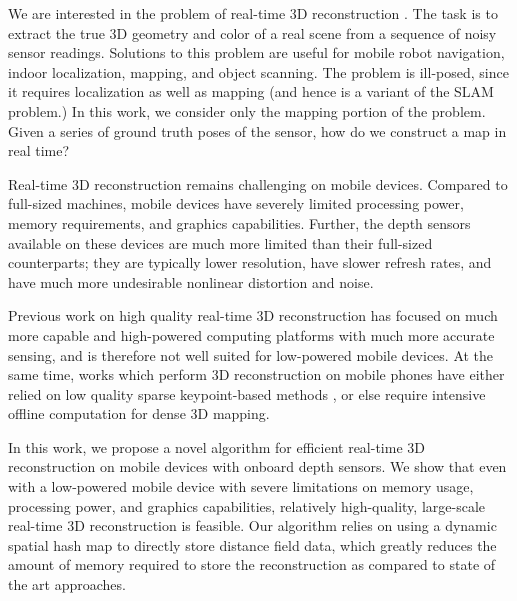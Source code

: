 \documentclass[10pt,twocolumn,letterpaper]{article}
\newcommand{\ssnote}[1]{{\xxnote{SS}{red}{#1}}}
\newcommand{\xxnote}[3]{}
\renewcommand{\xxnote}[3]{\color{#2}{#1: #3}}
\begin{document}
We are interested in the problem of real-time 3D reconstruction \ssnote{add generic cite}. The task is to
extract the true 3D geometry and color of a real scene from a sequence of noisy
sensor readings. Solutions to this problem are useful for mobile robot navigation,
indoor localization, mapping, and object scanning. The problem is ill-posed,
since it requires localization as well as mapping (and hence is a variant of
the SLAM problem.) 
\ssnote{You want to set this up by saying something like 'However, pose information is often available in hardware on 
several mobile devices'}
In this work, we consider only the mapping portion of the
problem. Given a series of ground truth poses of the sensor, how do we construct
a map in real time?

Real-time 3D reconstruction remains challenging on mobile devices. Compared to
full-sized machines, mobile devices have severely limited processing power,
memory requirements, and graphics capabilities. Further, the depth sensors
available on these devices are much more limited than their full-sized
counterparts; they are typically lower resolution, have slower refresh rates,
and have much more undesirable nonlinear distortion and noise.

Previous work on high quality real-time 3D reconstruction \cite{Newcombe,
Whelan2013, Bylow2013, DTAM} has focused on much more capable and high-powered
computing platforms with much more accurate sensing, and is therefore not well
suited for low-powered mobile devices. At the same time, works which perform 3D
reconstruction on mobile phones have either relied on low quality sparse
keypoint-based methods \cite{KleinSparse}, or else require intensive offline
computation \cite{TanskanenMetric} for dense 3D mapping.

In this work, we propose a novel algorithm for efficient real-time 3D
reconstruction on mobile devices with onboard depth sensors. We show that even
with a low-powered mobile device with severe limitations on memory usage,
processing power, and graphics capabilities, relatively high-quality,
large-scale real-time 3D reconstruction is feasible. Our algorithm relies on
using a dynamic spatial hash map \cite{SpatialHashing} to directly store
distance field data, which greatly reduces the amount of memory required to
store the reconstruction as compared to state of the art approaches.
\end{document}
